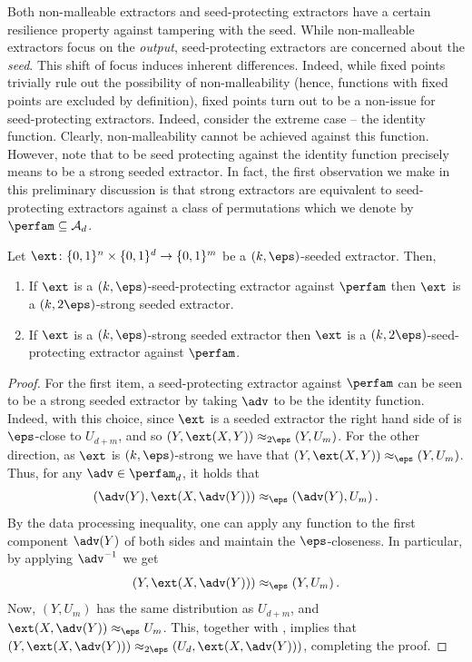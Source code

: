 Both non-malleable extractors and seed-protecting extractors have a certain resilience property against tampering %
with  %
the seed. While non-malleable extractors focus on the \emph{output}, seed-protecting extractors are concerned about the \emph{seed}. This shift of focus induces inherent differences. Indeed, while fixed points trivially rule out the possibility of non-malleability (hence, functions with fixed points are excluded by definition), fixed points turn out to be a non-issue for seed-protecting extractors.  Indeed, consider the extreme case -- the identity function. Clearly, non-malleability cannot be achieved against this function. However, note that to be seed protecting against the identity function precisely means to be a strong seeded extractor. In fact, the first observation we make in this preliminary discussion is that strong extractors are equivalent to seed-protecting extractors against
%
a class of permutations %
which we denote by $\perfam \subseteq \mathcal{A}_d$. %

%
\begin{claim}\label{c:intro strong sp}
Let $\ext \colon \{0,1\}^n \times \{0,1\}^d \to \{0,1\}^m$ be a $(k,\eps)$-seeded extractor. Then,
	\begin{enumerate}
		\item  If $\ext$ is a $(k,\eps)$-seed-protecting extractor against $\perfam$ then $\ext$ is a $(k,2\eps)$-strong seeded extractor.
		\item  If $\ext$ is a $(k,\eps)$-strong seeded extractor then $\ext$ is a $(k,2\eps)$-seed-protecting extractor against $\perfam$.
	\end{enumerate}
\end{claim}
\begin{proof}
  For the first item, a seed-protecting extractor against $\perfam$ can be seen to be a strong %
seeded extractor   %
by taking $\adv$ to be the identity function. Indeed, with this choice, since $\ext$ is
a 
%
seeded extractor   %
the right hand side of  is $\eps$-close to $U_{d+m}$, and so $(Y,\ext(X,Y)) \approx_{2\eps} (Y,U_m)$. 	For the other direction, as $\ext$ is $(k,\eps)$-strong we have that $(Y,\ext(X,Y)) \approx_\eps (Y,U_m)$. Thus, for any $\adv \in \perfam_d$, it holds that 
	$$(\adv(Y),\ext(X,\adv(Y))) \approx_\eps (\adv(Y),U_m)\,.$$
	By the data processing inequality, one can apply any function to the first component $\adv(Y)$ of both sides and maintain the $\eps$-closeness. In particular, by applying $\adv^{-1}$ we get 
	\begin{equation}\label{eq:12221121211}
	(Y,\ext(X,\adv(Y))) \approx_\eps (Y,U_m)\,.
	\end{equation}
	Now, $(Y,U_m)$ has the same distribution as $U_{d+m}$, and $\ext(X,\adv(Y)) \approx_\eps U_m$. This, together with , implies that $(Y,\ext(X,\adv(Y))) \approx_{2\eps} (U_d,\ext(X,\adv(Y)))$, completing the proof.
\end{proof}

